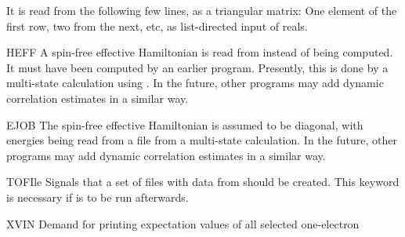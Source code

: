 \begin{keywordlist}
It is read from the following few lines, as a triangular matrix: One element
of the first row, two from the next, etc, as list-directed input of reals.
\item[HEFF]
A spin-free effective Hamiltonian is read from  instead of being computed.
It must have been computed by an earlier program. Presently, this is done by
a multi-state calculation using . In the future, other programs may add
dynamic correlation estimates in a similar way.
\item[EJOB]
The spin-free effective Hamiltonian is assumed to be diagonal, with energies
being read from a  file from a multi-state  calculation.
In the future, other programs may add dynamic correlation estimates in a similar way.
\item[TOFIle]
Signals that a set of files with data from  should be
created. This keyword is necessary if  is to be run
afterwards.
\item[XVIN]
Demand for printing expectation values of all selected one-electron

\end{keywordlist}
